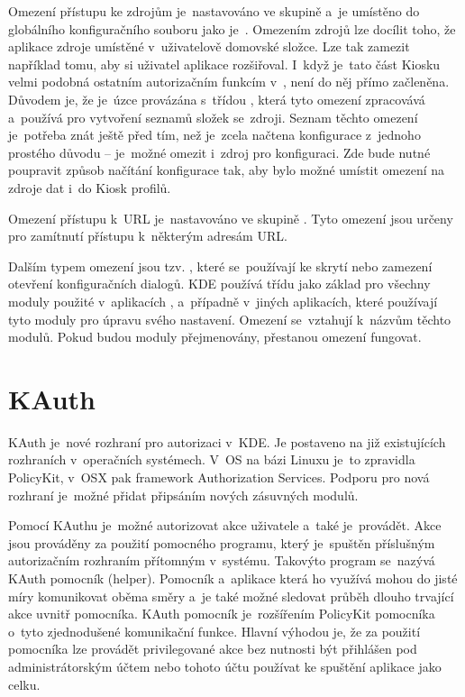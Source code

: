 Omezení přístupu ke zdrojům je~nastavováno ve skupině  a~je umístěno do globálního konfiguračního souboru jako je~. Omezením zdrojů lze docílit toho, že aplikace  zdroje umístěné v~uživatelově domovské složce. Lze tak zamezit například tomu, aby si uživatel aplikace rozšiřoval. I~když je~tato část Kiosku velmi podobná ostatním autorizačním funkcím v~, není do něj přímo začleněna. Důvodem je, že je~úzce provázána s~třídou , která tyto omezení zpracovává a~používá pro vytvoření seznamů složek se~zdroji. Seznam těchto omezení je~potřeba znát ještě před tím, než je~zcela načtena konfigurace z~jednoho prostého důvodu -- je~možné omezit i~zdroj pro konfiguraci. Zde bude nutné poupravit způsob načítání konfigurace tak, aby bylo možné umístit omezení na zdroje dat i~do Kiosk profilů.

Omezení přístupu k~URL je~nastavováno ve skupině . Tyto omezení jsou určeny pro zamítnutí přístupu k~některým adresám URL.

Dalším typem omezení jsou tzv. , které se~používají ke skrytí nebo zamezení otevření konfiguračních dialogů. KDE používá třídu  jako základ pro všechny moduly použité v~aplikacích ,  a~případně v~jiných aplikacích, které používají tyto moduly pro úpravu svého nastavení. Omezení se~vztahují k~názvům těchto modulů. Pokud budou moduly přejmenovány, přestanou omezení fungovat.

\section{KAuth}
KAuth je~nové rozhraní pro autorizaci v~KDE. Je postaveno na již existujících rozhraních v~operačních systémech. V~OS na bázi Linuxu je~to zpravidla PolicyKit, v~OSX pak framework Authorization Services. Podporu pro nová rozhraní je~možné přidat připsáním nových zásuvných modulů.

Pomocí KAuthu je~možné autorizovat akce uživatele a~také je~provádět. Akce jsou prováděny za použití pomocného programu, který je~spuštěn příslušným autorizačním rozhraním přítomným v~systému. Takovýto program se~nazývá KAuth pomocník (helper). Pomocník a~aplikace která ho využívá mohou do jisté míry komunikovat oběma směry a~je také možné sledovat průběh dlouho trvající akce uvnitř pomocníka. KAuth pomocník je~rozšířením PolicyKit pomocníka o~tyto zjednodušené komunikační funkce. Hlavní výhodou je, že za použití pomocníka lze provádět privilegované akce bez nutnosti být přihlášen pod administrátorským účtem nebo tohoto účtu používat ke spuštění aplikace jako celku.

